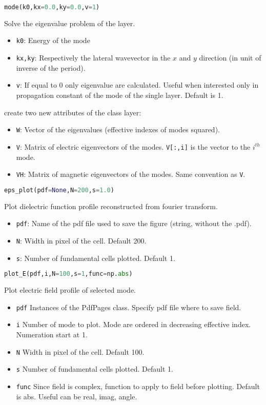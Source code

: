 \documentclass[a4paper,10pt]{report}
\begin{document}
\begin{lstlisting}[language=Python,basicstyle=\ttfamily\Large]
mode(k0,kx=0.0,ky=0.0,v=1)
\end{lstlisting}
Solve the eigenvalue problem of the layer.
\begin{itemize}[noitemsep,topsep=0pt,parsep=0pt,partopsep=0pt]
\item \texttt{k0}: Energy of the mode
\item \texttt{kx,ky}: Respectively the lateral wavevector in the $x$ and $y$ direction (in unit of inverse of the period).
\item  \texttt{v}: If equal to 0 only eigenvalue are calculated. Useful when interested only in propagation constant of the mode of the single layer. Default is 1.
\end{itemize}
create two new attributes of the class layer:
\begin{itemize}[noitemsep,topsep=0pt,parsep=0pt,partopsep=0pt]
\item \texttt{W}: Vector of the eigenvalues (effective indexes of modes squared). 
\item \texttt{V}: Matrix of electric eigenvectors of the modes. \texttt{V[:,i]} is the vector to the $i^{th}$ mode.
\item \texttt{VH}: Matrix of magnetic eigenvectors of the modes. Same convention as \texttt{V}.
\end{itemize}

\begin{lstlisting}[language=Python,basicstyle=\ttfamily\Large]
eps_plot(pdf=None,N=200,s=1.0)
\end{lstlisting}
Plot dielectric function profile reconstructed from fourier transform.
\begin{itemize}[noitemsep,topsep=0pt,parsep=0pt,partopsep=0pt]
\item \texttt{pdf}: Name of the pdf file used to save the figure (string, without the .pdf).
\item \texttt{N}: Width in pixel of the cell. Default 200.
\item \texttt{s}: Number of fundamental cells plotted. Default 1.
\end{itemize}

\begin{lstlisting}[language=Python,basicstyle=\ttfamily\Large]
plot_E(pdf,i,N=100,s=1,func=np.abs)
\end{lstlisting}
Plot electric field profile of selected mode.
\begin{itemize}[noitemsep,topsep=0pt,parsep=0pt,partopsep=0pt]
\item \texttt{pdf} Instances of the PdfPages class. Specify pdf file where to save field.
\item \texttt{i} Number of mode to plot. Mode are ordered in decreasing effective index. Numeration start at 1.
\item \texttt{N} Width in pixel of the cell. Default 100.
\item \texttt{s} Number of fundamental cells plotted. Default 1.
\item \texttt{func} Since field is complex, function to apply to field before plotting. Default is abs. Useful can be real, imag, angle. 
\end{itemize}
\end{document}
